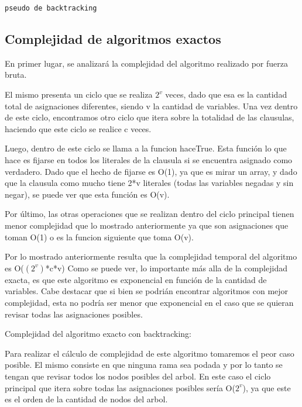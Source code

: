 \documentclass[a4paper,10pt]{article}
\begin{document}
\begin{verbatim}
pseudo de backtracking
\end{verbatim}

\subsection*{Complejidad de algoritmos exactos}

En primer lugar, se analizar\'a la complejidad del algoritmo realizado por fuerza bruta.

El mismo presenta un ciclo que se realiza $2^{v}$ veces, dado que esa es la cantidad total de asignaciones diferentes, siendo v la cantidad de variables. Una vez dentro de este ciclo, encontramos otro ciclo que itera sobre la totalidad de las clausulas, haciendo que este ciclo se realice c veces. 

Luego, dentro de este ciclo se llama a la funcion haceTrue. Esta funci\'on lo que hace es fijarse en todos los literales de la clausula si se encuentra asignado como verdadero. Dado que el hecho de fijarse es O(1), ya que es mirar un array, y dado que la clausula como mucho tiene 2*v literales (todas las variables negadas y sin negar), se puede ver que esta funci\'on es O(v).

Por \'ultimo, las otras operaciones que se realizan dentro del ciclo principal tienen menor complejidad que lo mostrado anteriormente ya que son asignaciones que toman O(1) o es la funcion siguiente que toma O(v).

Por lo mostrado anteriormente resulta que la complejidad temporal del algoritmo es O($(2^{v})$*c*v)
Como se puede ver, lo importante m\'as alla de la complejidad exacta, es que este algoritmo es exponencial en funci\'on de la cantidad de variables. Cabe destacar que si bien se podri\'an encontrar algoritmos con mejor complejidad, esta no podr\'ia ser menor que exponencial en el caso que se quieran revisar todas las asignaciones posibles.

\bigskip

Complejidad del algoritmo exacto con backtracking:

Para realizar el c\'alculo de complejidad de este algoritmo tomaremos el peor caso posible. El mismo consiste en que ninguna rama sea podada y por lo tanto se tengan que revisar todos los nodos posibles del arbol. En este caso el ciclo principal que itera sobre todas las asignaciones posibles ser\'ia O($2^{v}$), ya que este es el orden de la cantidad de nodos del arbol. 
\end{document}
